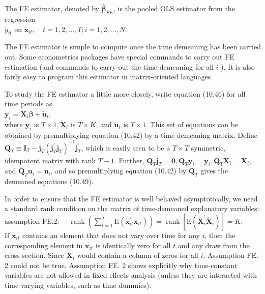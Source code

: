 \documentclass[10pt]{article}
\begin{document}
The FE estimator, denoted by $\hat{\boldsymbol{\beta}}_{F E}$, is the pooled OLS estimator from the regression\\
$\ddot{y}_{i t}$ on $\ddot{\mathbf{x}}_{i t}, \quad t=1,2, \ldots, T ; i=1,2, \ldots, N$.

The FE estimator is simple to compute once the time demeaning has been carried out. Some econometrics packages have special commands to carry out FE estimation (and commands to carry out the time demeaning for all $i$ ). It is also fairly easy to program this estimator in matrix-oriented languages.

To study the FE estimator a little more closely, write equation (10.46) for all time periods as\\
$\ddot{\mathbf{y}}_{i}=\ddot{\mathbf{X}}_{i} \boldsymbol{\beta}+\ddot{\mathbf{u}}_{i}$,\\
where $\ddot{\mathbf{y}}_{i}$ is $T \times 1, \ddot{\mathbf{X}}_{i}$ is $T \times K$, and $\ddot{\mathbf{u}}_{i}$ is $T \times 1$. This set of equations can be obtained by premultiplying equation (10.42) by a time-demeaning matrix. Define $\mathbf{Q}_{T} \equiv \mathbf{I}_{T}- \mathbf{j}_{T}\left(\mathbf{j}_{T}^{\prime} \mathbf{j}_{T}\right)^{-1} \mathbf{j}_{T}^{\prime}$, which is easily seen to be a $T \times T$ symmetric, idempotent matrix with rank $T-1$. Further, $\mathbf{Q}_{T} \mathbf{j}_{T}=\mathbf{0}, \mathbf{Q}_{T} \mathbf{y}_{i}=\ddot{\mathbf{y}}_{i}, \mathbf{Q}_{T} \mathbf{X}_{i}=\ddot{\mathbf{X}}_{i}$, and $\mathbf{Q}_{T} \mathbf{u}_{i}=\ddot{\mathbf{u}_{i}}$, and so premultiplying equation (10.42) by $\mathbf{Q}_{T}$ gives the demeaned equations (10.49).

In order to ensure that the FE estimator is well behaved asymptotically, we need a standard rank condition on the matrix of time-demeaned explanatory variables:\\
assumption FE.2: $\quad \operatorname{rank}\left(\sum_{t=1}^{T} \mathrm{E}\left(\ddot{\mathbf{x}}_{i t}^{\prime} \ddot{\mathbf{x}}_{i t}\right)\right)=\operatorname{rank}\left[\mathrm{E}\left(\ddot{\mathbf{X}}_{i}^{\prime} \ddot{\mathbf{X}}_{i}\right)\right]=K$.\\
If $\mathbf{x}_{i t}$ contains an element that does not vary over time for any $i$, then the corresponding element in $\ddot{\mathbf{x}}_{i t}$ is identically zero for all $t$ and any draw from the cross section. Since $\ddot{\mathbf{X}}_{i}$ would contain a column of zeros for all $i$, Assumption FE. 2 could not be true. Assumption FE. 2 shows explicitly why time-constant variables are not allowed in fixed effects analysis (unless they are interacted with time-varying variables, such as time dummies).
\end{document}
